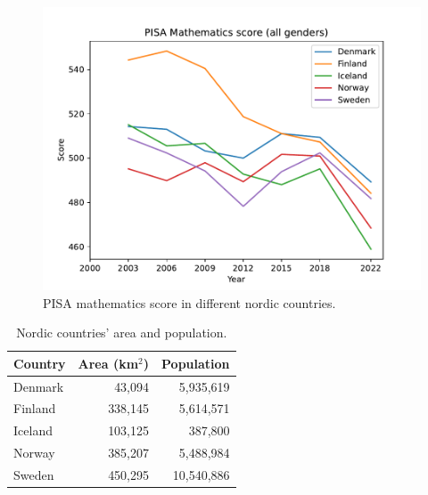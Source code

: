 \documentclass[a4paper]{article}
\begin{document}
\begin{figure}[htb]
  \begin{center}
    \includegraphics[width=\textwidth]{pisa_mathematics_in_nordic_countries.pdf}
    \caption{PISA mathematics score in different nordic countries.}
    \label{fig:example1}
  \end{center}
\end{figure}

\begin{table}[htb]
  \begin{center}
    \caption{Nordic countries' area and population.}
    \label{tbl:example2}
    \begin{tabular}{l|rr}
      Country & Area (km$^2$) & Population \\\hline
      Denmark & 43,094 & 5,935,619 \\
      Finland & 338,145 & 5,614,571 \\
      Iceland & 103,125 & 387,800 \\
      Norway  & 385,207 & 5,488,984 \\
      Sweden  & 450,295 & 10,540,886 \\
    \end{tabular}
  \end{center}
\end{table}


\printbibliography
\end{document}

